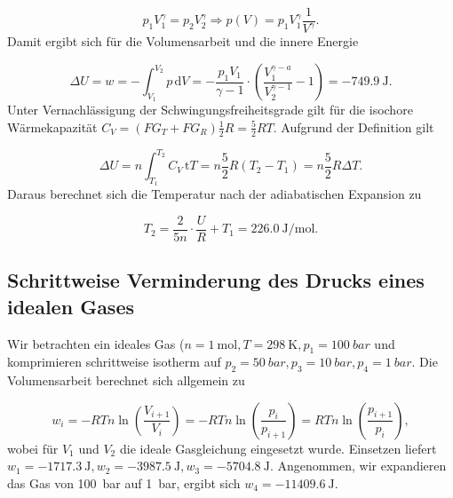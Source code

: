         \begin{equation}
          p_1 V_1^{\gamma} = p_2 V_2^{\gamma} \Rightarrow p(V) = p_1 V_1^{\gamma} \frac{1}{V^{\gamma}}.
        \end{equation}
      Damit ergibt sich für die Volumensarbeit und die innere Energie
      
        \begin{equation}
          \Delta U = w = - \int_{V_1}^{V_2} p \, \text{d} V = - \frac{p_1 V_1}{\gamma - 1} \cdot \left(\frac{V_1^{\gamma - a}}{V_2^{\gamma - 1}} - 1\right) = \SI[mode=text]{-749.9}{\joule}.
        \end{equation}
      Unter Vernachlässigung der Schwingungsfreiheitsgrade gilt für die isochore Wärmekapazität $C_V = (FG_T + FG_R)\frac{1}{2} R = \frac{5}{2} RT$. Aufgrund der Definition gilt
      
        \begin{equation}
          \Delta U = n \int_{T_1}^{T_2} C_V \, \text{t} T = n \frac{5}{2} R \left(T_2 - T_1\right) = n \frac{5}{2} R \Delta T.
        \end{equation}
        Daraus berechnet sich die Temperatur nach der adiabatischen Expansion zu 
        
          \begin{equation}
            T_2 = \frac{2}{5 n} \cdot \frac{U}{R} + T_1 = \SI[mode=text]{226.0}{\joule\per\mole}.
          \end{equation}
          
  \subsection{Schrittweise Verminderung des Drucks eines idealen Gases}
  
    Wir betrachten ein ideales Gas ($n = \SI[mode=text]{1}{\mole}, T = \SI[mode=text]{298}{\kelvin}, p_1 = \SI[mode=text]{100}{bar}$ und komprimieren schrittweise isotherm auf $p_2 = \SI[mode=text]{50}{bar}, p_3 = \SI[mode=text]{10}{bar}, p_4 = \SI[mode=text]{1}{bar}$. Die Volumensarbeit berechnet sich allgemein zu
    
      \begin{equation}
        w_i = - RTn \ln\left(\frac{V_{i+1}}{V_i}\right) = - RTn \ln\left(\frac{p_i}{p_{i+1}}\right) = RTn \ln\left(\frac{p_{i+1}}{p_i}\right),
      \end{equation}
      wobei für $V_1$ und $V_2$ die ideale Gasgleichung eingesetzt wurde. Einsetzen liefert $w_1 = \SI[mode=text]{-1717.3}{\joule}, w_2 = \SI[mode=text]{-3987.5}{\joule}, w_3 = \SI[mode=text]{-5704.8}{\joule}$. Angenommen, wir expandieren das Gas von \SI[mode=text]{100}{bar} auf \SI[mode=text]{1}{bar}, ergibt sich $w_4 = \SI[mode=text]{-11409.6}{\joule}$. 
      
